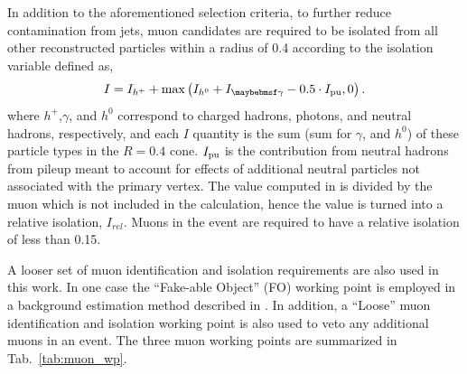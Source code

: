 In addition to the aforementioned selection criteria, to further reduce contamination from jets, muon candidates are required to be isolated from all other reconstructed particles within a radius of 0.4 according to the isolation variable defined as,
\begin{equation}
I = I_{h^+} + \max\left(I_{h^0} + I_{\gamma} - 0.5\cdot I_{\mbox{\scriptsize{pu}}}, 0\right).
\label{eq:muonIso}
\end{equation}
where $h^+$,$\gamma$, and $h^0$ correspond to charged hadrons, photons, and neutral hadrons, respectively, and each $I$ quantity is the sum \pt (sum \Et for $\gamma$, and $h^0$) of these particle types in the $R=0.4$ cone. $I_{\mbox{\scriptsize{pu}}}$ is the contribution from neutral hadrons from pileup meant to account for effects of additional neutral particles not associated with the primary vertex. The value computed in  is divided by the muon \pt which is not included in the calculation, hence the value is turned into a relative isolation, $I_{rel}$. Muons in the event are required to have a relative isolation of less than 0.15.  

A looser set of muon identification and isolation requirements are also used in this work. In one case the ``Fake-able Object'' (FO) working point is employed in a background estimation method described in . In addition, a ``Loose'' muon identification and isolation working point is also used to veto any additional muons in an event. The three muon working points are summarized in Tab.~\ref{tab:muon_wp}.

